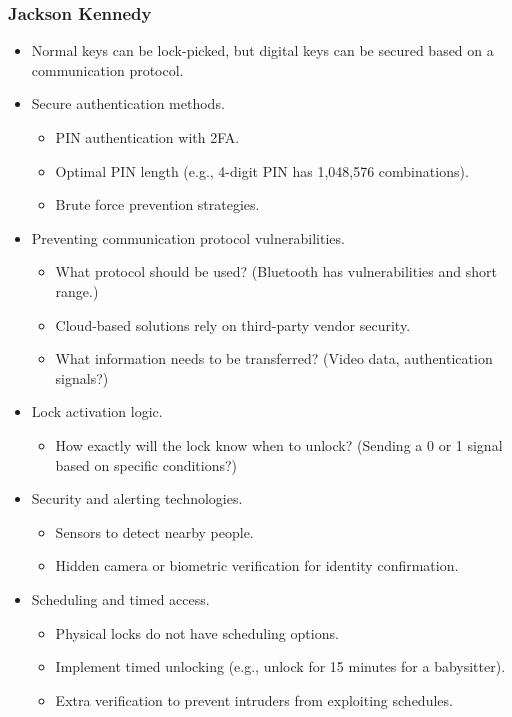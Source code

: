 \subsubsection*{Jackson Kennedy}
\begin{itemize}
    \item Normal keys can be lock-picked, but digital keys can be secured based on a communication protocol.
    \item Secure authentication methods.
    \begin{itemize}
        \item PIN authentication with 2FA.
        \item Optimal PIN length (e.g., 4-digit PIN has 1,048,576 combinations).
        \item Brute force prevention strategies.
    \end{itemize}
    \item Preventing communication protocol vulnerabilities.
    \begin{itemize}
        \item What protocol should be used? (Bluetooth has vulnerabilities and short range.)
        \item Cloud-based solutions rely on third-party vendor security.
        \item What information needs to be transferred? (Video data, authentication signals?)
    \end{itemize}
    \item Lock activation logic.
    \begin{itemize}
        \item How exactly will the lock know when to unlock? (Sending a 0 or 1 signal based on specific conditions?)
    \end{itemize}
    \item Security and alerting technologies.
    \begin{itemize}
        \item Sensors to detect nearby people.
        \item Hidden camera or biometric verification for identity confirmation.
    \end{itemize}
    \item Scheduling and timed access.
    \begin{itemize}
        \item Physical locks do not have scheduling options.
        \item Implement timed unlocking (e.g., unlock for 15 minutes for a babysitter).
        \item Extra verification to prevent intruders from exploiting schedules.
    \end{itemize}
\end{itemize}
\newpage

